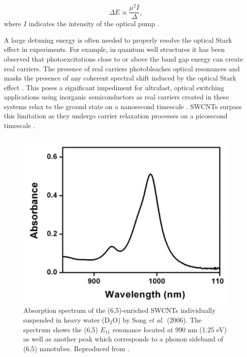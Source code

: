 
\begin{equation}
		\Delta E \propto \frac{\mu^2 I}{\Delta},
		\label{eq:ose_blueshift}
\end{equation}
where $I$ indicates the intensity of the optical pump \cite{combescot1992semiconductors}.

A large detuning energy is often needed to properly resolve the optical Stark effect in experiments. For example, in quantum well structures it has been observed that photoexcitations close to or above the band gap energy can create real carriers. The presence of real carriers photobleaches optical resonances and masks the presence of any coherent spectral shift induced by the optical Stark effect \cite{peyghambarian1984blue}. This poses a significant impediment for ultrafast, optical switching applications using inorganic semiconductors as real carriers created in these systems relax to the ground state on a nanosecond timescale \cite{maeda2006gigantic}. SWCNTs surpass this limitation as they undergo carrier relaxation processes on a picosecond timescale \cite{ostojic2004interband, wang2004observation, manzoni2005intersubband, maeda2006gigantic}.

\begin{figure}[ht]
	\centering
	\includegraphics[scale=0.4]{images/chapter_prior_works/absorption_spectrum_song_2006}
	\caption{Absorption spectrum of the (6,5)-enriched SWCNTs individually suspended in heavy water ($\text{D}_2 \text{O}$) by Song \textit{et al}.\ (2006). The spectrum shows the (6,5) $E_{11}$ resonance located at 990 nm (1.25 eV) as well as another peak which corresponds to a phonon sideband of (6,5) nanotubes. Reproduced from \cite{song2006optical}.}
	\label{fig:abs_song_2006}
\end{figure}

